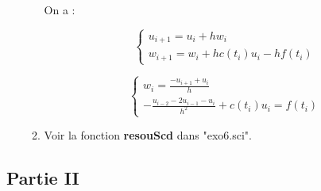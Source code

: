 \documentclass[12pt, letterpaper]{article}
\begin{document}
\begin{enumerate}
\begin{enumerate}
    On a :

    \begin{equation*}
      \left\{
      \begin{array}{l}
        u_{i+1} = u_i + h w_i \\
        w_{i+1} = w_i + h c(t_i) u_i - h f(t_i)
      \end{array}
      \right.
    \end{equation*}

    \begin{equation*}
      \left\{
      \begin{array}{l}
        w_i = \frac{- u_{i+1} + u_i}{h} \\
        - \frac{u_{i-2} - 2 u_{i-1} - u_i}{h^2} + c(t_i) u_i = f(t_i)
      \end{array}
      \right.
    \end{equation*}

    
  \item
    Voir la fonction \textbf{resouScd} dans "exo6.sci".
    
  \end{enumerate}
  
\end{enumerate}

\subsection*{Partie II}
\end{document}
